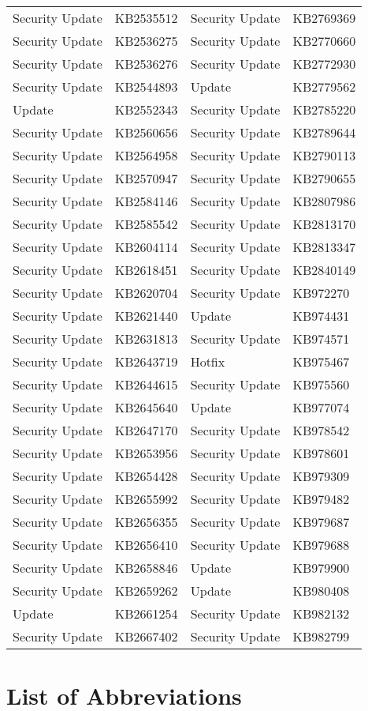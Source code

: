 \begin{longtable}{ l | l || l | l }
  Security Update  & KB2535512  & Security Update  & KB2769369  \\
  Security Update  & KB2536275  & Security Update  & KB2770660  \\
  Security Update  & KB2536276  & Security Update  & KB2772930  \\
  Security Update  & KB2544893  & Update           & KB2779562  \\
  Update           & KB2552343  & Security Update  & KB2785220  \\
  Security Update  & KB2560656  & Security Update  & KB2789644  \\
  Security Update  & KB2564958  & Security Update  & KB2790113  \\
  Security Update  & KB2570947  & Security Update  & KB2790655  \\
  Security Update  & KB2584146  & Security Update  & KB2807986  \\
  Security Update  & KB2585542  & Security Update  & KB2813170  \\
  Security Update  & KB2604114  & Security Update  & KB2813347  \\
  Security Update  & KB2618451  & Security Update  & KB2840149  \\
  Security Update  & KB2620704  & Security Update  & KB972270   \\
  Security Update  & KB2621440  & Update           & KB974431   \\
  Security Update  & KB2631813  & Security Update  & KB974571   \\
  Security Update  & KB2643719  & Hotfix           & KB975467   \\
  Security Update  & KB2644615  & Security Update  & KB975560   \\
  Security Update  & KB2645640  & Update           & KB977074   \\
  Security Update  & KB2647170  & Security Update  & KB978542   \\
  Security Update  & KB2653956  & Security Update  & KB978601   \\
  Security Update  & KB2654428  & Security Update  & KB979309   \\
  Security Update  & KB2655992  & Security Update  & KB979482   \\
  Security Update  & KB2656355  & Security Update  & KB979687   \\
  Security Update  & KB2656410  & Security Update  & KB979688   \\
  Security Update  & KB2658846  & Update           & KB979900   \\
  Security Update  & KB2659262  & Update           & KB980408   \\
  Update           & KB2661254  & Security Update  & KB982132   \\
  Security Update  & KB2667402  & Security Update  & KB982799   \\
\end{longtable}

\chapter{List of Abbreviations} \label{app:glossary}
\printglossary[type=\acronymtype,style=super,title=]
